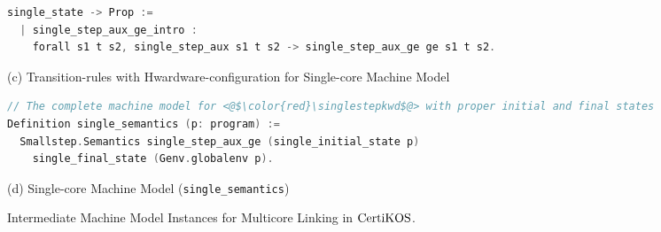 \begin{figure}
\begin{lstlisting}[language=C]
  single_state -> Prop :=
  | single_step_aux_ge_intro : 
    forall s1 t s2, single_step_aux s1 t s2 -> single_step_aux_ge ge s1 t s2.
\end{lstlisting}
\begin{center}
(c) Transition-rules with Hwardware-configuration for Single-core Machine Model
\end{center}
\begin{lstlisting}[language=C, deletekeywords={int}]    
// The complete machine model for <@$\color{red}\singlestepkwd$@> with proper initial and final states
Definition single_semantics (p: program) :=
  Smallstep.Semantics single_step_aux_ge (single_initial_state p) 
    single_final_state (Genv.globalenv p).
\end{lstlisting}
\begin{center}
(d) Single-core Machine Model (\lstinline$single_semantics$)
\end{center}
\caption{Intermediate Machine Model Instances for Multicore Linking in $\mathrm{CertiKOS}$.}
\label{fig:chapter:certikos:multicore-machine-model-instances}
\end{figure}


